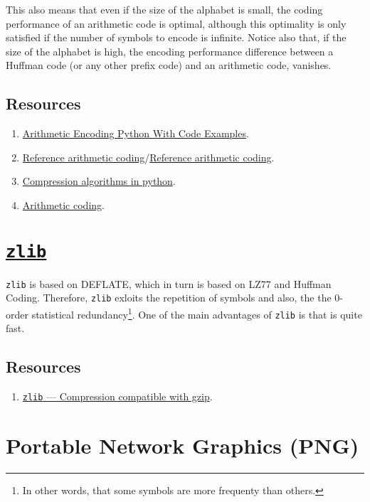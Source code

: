 This also means that even if the size of the alphabet is small, the
coding performance of an arithmetic code is optimal, although this
optimality is only satisfied if the number of symbols to encode is
infinite. Notice also that, if the size of the alphabet is high, the
encoding performance difference between a Huffman code (or any other
prefix code) and an arithmetic code, vanishes.

\subsection*{Resources}
\begin{enumerate}
\item
  \href{https://www.folkstalk.com/tech/arithmetic-encoding-python-with-code-examples/}{Arithmetic
    Encoding Python With Code Examples}.
\item \href{https://www.nayuki.io/page/reference-arithmetic-coding}{Reference arithmetic coding}/\href{https://github.com/nayuki/Reference-arithmetic-coding}{Reference arithmetic coding}.
\item \href{https://www.inference.org.uk/mackay/python/compress/#AC}{Compression algorithms in python}.
\item \href{https://github.com/vicente-gonzalez-ruiz/arithmetic_coding}{Arithmetic coding}.
\end{enumerate}

\section{\href{https://zlib.net/}{\texttt{zlib}}}

\texttt{zlib} is based on DEFLATE, which in turn is based on LZ77 and
Huffman Coding. Therefore, \texttt{zlib} exloits the repetition of
symbols and also, the the 0-order statistical redundancy\footnote{In
  other words, that some symbols are more frequenty than others.}. One
of the main advantages of \texttt{zlib} is that is quite fast.

\subsection*{Resources}
\begin{enumerate}
\item \href{https://docs.python.org/3/library/zlib.html}{\texttt{zlib}
    — Compression compatible with gzip}.
\end{enumerate}

\section{Portable Network Graphics (PNG)}

